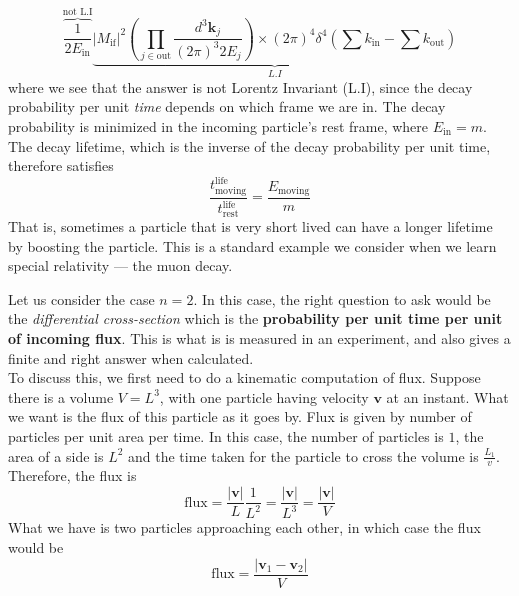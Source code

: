 \documentclass[11pt]{article}
\numberwithin{equation}{section}
\begin{document}
    \begin{equation*}
        \overbrace{\frac{1}{2E_{\text{in}}}}^{\text{not L.I}} \underbrace{| M_{\text{if}}|^2 \left(\prod_{j\in\text{out}}\frac{d^3\textbf{k}_j}{(2\pi)^3 2E_j}\right) \times (2\pi)^4\delta^4\left(\sum k_{\text{in}} - \sum k_{\text{out}} \right)}_{L.I}
    \end{equation*}
    where we see that the answer is not Lorentz Invariant (L.I), since the decay probability per unit \textit{time} depends on which frame we are in. The decay probability is minimized in the incoming particle's rest frame, where \(E_{\text{in}} = m\). The decay lifetime, which is the inverse of the decay probability per unit time, therefore satisfies
    \begin{equation*}
        \frac{t^{\text{life}}_{\text{moving}}}{t^{\text{life}}_{\text{rest}}} = \frac{E_{\text{moving}}}{m}
    \end{equation*}
    That is, sometimes a particle that is very short lived can have a longer lifetime by boosting the particle. This is a standard example we consider when we learn special relativity — the muon decay.

    Let us consider the case \(n=2\). In this case, the right question to ask would be the \textit{differential cross-section} which is the \textbf{probability per unit time per unit of incoming flux}. This is what is is measured in an experiment, and also gives a finite and right answer when calculated. \\
    
    To discuss this, we first need to do a kinematic computation of flux. Suppose there is a volume \(V = L^3\), with one particle having velocity \(\textbf{v}\) at an instant. What we want is the flux of this particle as it goes by. Flux is given by number of particles per unit area per time. In this case, the number of particles is \(1\), the area of a side is \(L^2\) and the time taken for the particle to cross the volume is \(\displaystyle\frac{L_1}{v}\). Therefore, the flux is 
    \begin{equation*}
        \text{flux} = \frac{|\textbf{v}|}{L}\frac{1}{L^2} = \frac{|\textbf{v}|}{L^3} = \frac{|\textbf{v}|}{V}
    \end{equation*}
    What we have is two particles approaching each other, in which case the flux would be 
    \begin{equation*}
        \text{flux} = \frac{|\textbf{v}_1 - \textbf{v}_2|}{V}
    \end{equation*}
\end{document}
